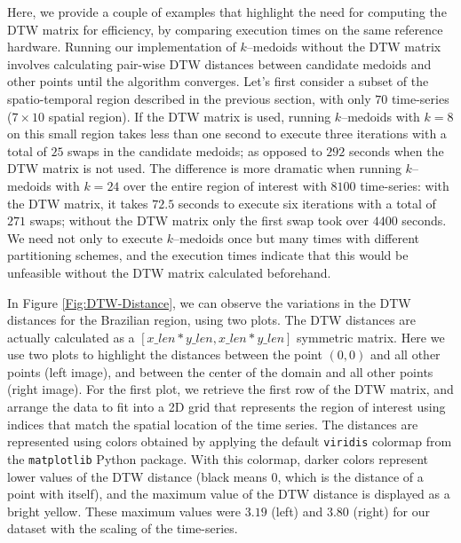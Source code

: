 Here, we provide a couple of examples that highlight the need for computing the DTW matrix for efficiency, by comparing execution times on the same reference hardware. Running our implementation of $k$--medoids without the DTW matrix involves calculating pair-wise DTW distances between candidate medoids and other points until the algorithm converges. Let's first consider a subset of the spatio-temporal region described in the previous section, with only $70$ time-series ($7 \times 10$ spatial region). If the DTW matrix is used, running $k$--medoids with $k=8$ on this small region takes less than one second to execute three iterations with a total of $25$ swaps in the candidate medoids; as opposed to $292$ seconds when the DTW matrix is not used. The difference is more dramatic when running $k$--medoids with $k=24$ over the entire region of interest with $8100$ time-series: with the DTW matrix, it  takes $72.5$ seconds to execute six iterations with a total of $271$ swaps; without the DTW matrix only the first swap took over $4400$ seconds. We need not only to execute $k$--medoids once but many times with different partitioning schemes, and the execution times indicate that this would be unfeasible without the DTW matrix calculated beforehand.

In Figure \ref{Fig:DTW-Distance}, we can observe the variations in the DTW distances for the Brazilian region, using two plots. The DTW distances are actually calculated as a $[x\_len * y\_len, x\_len * y\_len]$ symmetric matrix. Here we use two plots to highlight the distances between the point $(0, 0)$ and all other points (left image), and between the center of the domain and all other points (right image). For the first plot, we retrieve the first row of the DTW matrix, and arrange the data to fit into a 2D grid that represents the region of interest using indices that match the spatial location of the time series. The distances are represented using colors obtained by applying the default \texttt{viridis} colormap from the \texttt{matplotlib} Python package. With this colormap, darker colors represent lower values of the DTW distance (black means 0, which is the distance of a point with itself), and the maximum value of the DTW distance is displayed as a bright yellow. These maximum values were $3.19$ (left) and $3.80$ (right) for our dataset with the scaling of the time-series.

